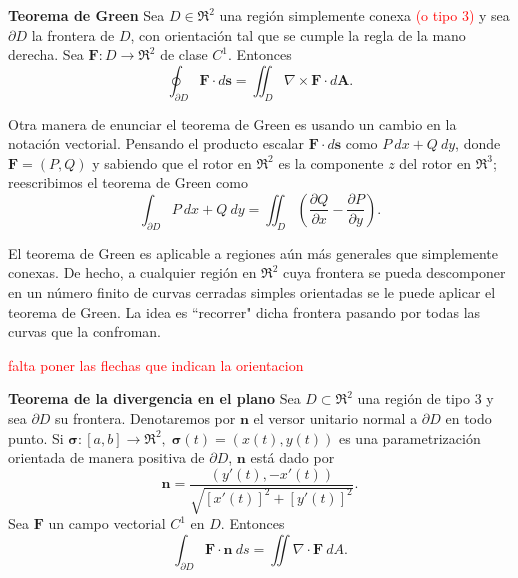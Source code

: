 \begin{theorem}
    \textbf{Teorema de Green} Sea $D\in\Re^2$ una regi\'on simplemente conexa \textcolor{red}{(o tipo 3)} y sea $\partial D$ la frontera de $D$, con orientaci\'on tal que se cumple la regla de la mano derecha. Sea $\mathbf{F}:D\to\Re^2$ de clase $C^1$. Entonces
    \[
        \oint_{\partial D}\mathbf{F}\cdot d\mathbf{s} = \iint_D \nabla\times\mathbf{F}\cdot d\mathbf{A}.
    \]
\end{theorem}

Otra manera de enunciar el teorema de Green es usando un cambio en la notaci\'on vectorial. Pensando el producto escalar $\mathbf{F}\cdot d\mathbf{s}$ como $P\:dx+Q\:dy$, donde $\mathbf{F}=(P,Q)$ y sabiendo que el rotor en $\Re^2$ es la componente $z$ del rotor en $\Re^3$; reescribimos el teorema de Green como
\[
        \int_{\partial D}P\:dx+Q\:dy=\iint_D\left(\frac{\partial Q}{\partial x}-\frac{\partial P}{\partial y}\right).
\]

El teorema de Green es aplicable a regiones a\'un m\'as generales que simplemente conexas. De hecho, a cualquier regi\'on en $\Re^2$ cuya frontera se pueda descomponer en un n\'umero finito de curvas cerradas simples orientadas se le puede aplicar el teorema de Green. La idea es ``recorrer" dicha frontera pasando por todas las curvas que la confroman.

\begin{center}
\end{center}
\textcolor{red}{falta poner las flechas que indican la orientacion}

\begin{theorem}
\textbf{Teorema de la divergencia en el plano} Sea $D\subset\Re^2$ una regi\'on de tipo 3 y sea $\partial D$ su frontera. Denotaremos por $\mathbf{n}$ el versor unitario normal a $\partial D$ en todo punto. Si $\mathbf{\sigma}:[a,b]\to\Re^2,\;\mathbf{\sigma}(t)=(x(t),y(t))$ es una parametrizaci\'on orientada de manera positiva de $\partial D$, $\mathbf{n}$ est\'a dado por 
\[
    \mathbf{n}=\frac{(y'(t),-x'(t))}{\sqrt{[x'(t)]^2+[y'(t)]^2}}.
\]
Sea $\mathbf{F}$ un campo vectorial $C^1$ en $D$. Entonces
\[
    \int_{\partial D}\mathbf{F}\cdot\mathbf{n}\:ds=\iint\nabla\cdot\mathbf{F}\:dA.
\]
\end{theorem}

